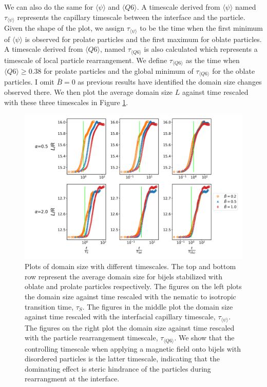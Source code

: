 We can also do the same for $\langle \psi \rangle$ and
$\langle Q6 \rangle$. A timescale derived from
$\langle \psi \rangle$ named $\tau_{\langle \psi \rangle}$
represents the capillary timescale between the interface and the
particle. Given the shape of the plot, we assign
$\tau_{\langle \psi \rangle}$ to be the time when the first minimum of
$\langle \psi \rangle$ is observed for prolate particles and the first
maximum for oblate particles. A timescale derived from
$\langle Q6 \rangle$, named $\tau_{\langle Q6 \rangle}$ is also
calculated which represents a timescale of local particle rearrangement.
We define $\tau_{\langle Q6 \rangle}$ as the time when
\(\langle Q6 \rangle \geq 0.38\) for prolate particles and the global
minimum of $\tau_{\langle Q6 \rangle}$ for the oblate particles. I
omit \(\bar{B} = 0\) as previous results have identified the domain size
changes observed there. We then plot the average domain size $L$
against time rescaled with these three timescales in Figure
\ref{fig:domain_size-field_on-scaled}.

\begin{figure} 
\centering 
\includegraphics[scale=0.4]{../figures/results/paper2/domain_size-field_on-scaled.png} 
\caption{Plots of domain size with different timescales. The top and bottom row represent the average domain size for bijels stabilized with oblate and 
         prolate particles respectively. The figures on the left plots the domain size against time rescaled with the nematic to isotropic transition time, 
         $\tau_S$. The figures in the middle plot the domain size against time rescaled with the interfacial capillary timescale, $\tau_{\langle \psi \rangle}$. 
         The figures on the right plot the domain size against time rescaled with the particle rearrangement timescale, $\tau_{\langle Q6 \rangle}$. We show 
         that the controlling timescale when applying a magnetic field onto bijels with disordered particles is the latter timescale, indicating that the 
         dominating effect is steric hindrance of the particles during rearrangment at the interface.} 
\label{fig:domain_size-field_on-scaled} 
\end{figure}

